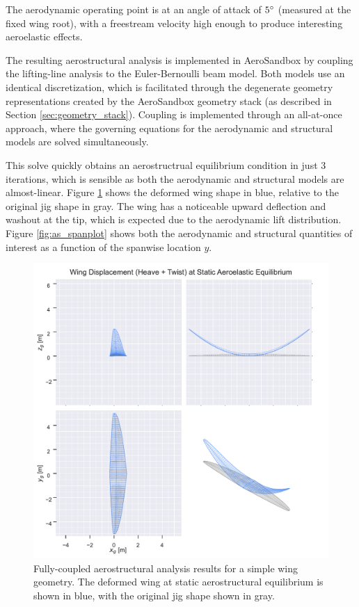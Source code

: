 The aerodynamic operating point is at an angle of attack of $5\degree$ (measured at the fixed wing root), with a freestream velocity high enough to produce interesting aeroelastic effects.

The resulting aerostructural analysis is implemented in AeroSandbox by coupling the lifting-line analysis to the Euler-Bernoulli beam model. Both models use an identical discretization, which is facilitated through the degenerate geometry representations created by the AeroSandbox geometry stack (as described in Section \ref{sec:geometry_stack}). Coupling is implemented through an all-at-once approach, where the governing equations for the aerodynamic and structural models are solved simultaneously.

This solve quickly obtains an aerostructrual equilibrium condition in just 3 iterations, which is sensible as both the aerodynamic and structural models are almost-linear. Figure \ref{fig:as_deformation} shows the deformed wing shape in blue, relative to the original jig shape in gray. The wing has a noticeable upward deflection and washout at the tip, which is expected due to the aerodynamic lift distribution. Figure \ref{fig:as_spanplot} shows both the aerodynamic and structural quantities of interest as a function of the spanwise location $y$.

\begin{figure}[H]
    \centering
    \includegraphics[width=\textwidth]{../figures/aerostructural/deformation.pdf}
    \caption{Fully-coupled aerostructural analysis results for a simple wing geometry. The deformed wing at static aerostructural equilibrium is shown in blue, with the original jig shape shown in gray.}
    \label{fig:as_deformation}
\end{figure}

